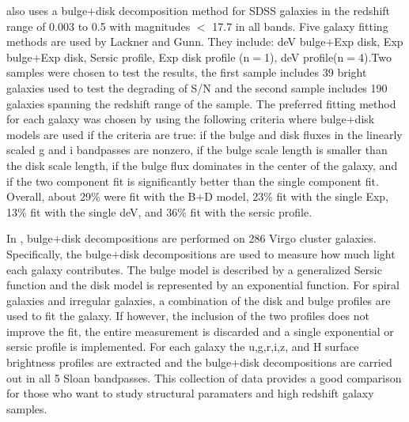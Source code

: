 \documentclass[12pt,preprint,pdftex]{aastex}
\begin{document}
\cite{lackner} also uses a bulge$+$disk decomposition method for SDSS
galaxies in the redshift range of 0.003 to 0.5 with magnitudes $<$
17.7 in all bands. Five galaxy fitting methods are used by Lackner and
Gunn. They include: deV bulge$+$Exp disk, Exp bulge$+$Exp disk, Sersic
profile, Exp disk profile (n$=$1), deV profile(n$=$4).Two samples were
chosen to test the results, the first sample includes 39 bright
galaxies used to test the degrading of S/N and the second sample
includes 190 galaxies spanning the redshift range of the sample. The
preferred fitting method for each galaxy was chosen by using the
following criteria where bulge$+$disk models are used if the criteria
are true: if the bulge and disk fluxes in the linearly scaled g and i
bandpasses are nonzero, if the bulge scale length is smaller than the
disk scale length, if the bulge flux dominates in the center of the
galaxy, and if the two component fit is significantly better than the
single component fit. Overall, about 29\% were fit with the B$+$D
model, 23\% fit with the single Exp, 13\% fit with the single deV, and
36\% fit with the sersic profile.

In \cite{mcdonald}, bulge$+$disk decompositions are performed on 286
Virgo cluster galaxies. Specifically, the bulge$+$disk decompositions
are used to measure how much light each galaxy contributes. The bulge
model is described by a generalized Sersic function and the disk model
is represented by an exponential function. For spiral galaxies and
irregular galaxies, a combination of the disk and bulge profiles are
used to fit the galaxy. If however, the inclusion of the two profiles
does not improve the fit, the entire measurement is discarded and a
single exponential or sersic profile is implemented. For each galaxy
the u,g,r,i,z, and H surface brightness profiles are extracted and the
bulge$+$disk decompositions are carried out in all 5 Sloan
bandpasses. This collection of data provides a good comparison for
those who want to study structural paramaters and high redshift galaxy
samples.
\end{document}
